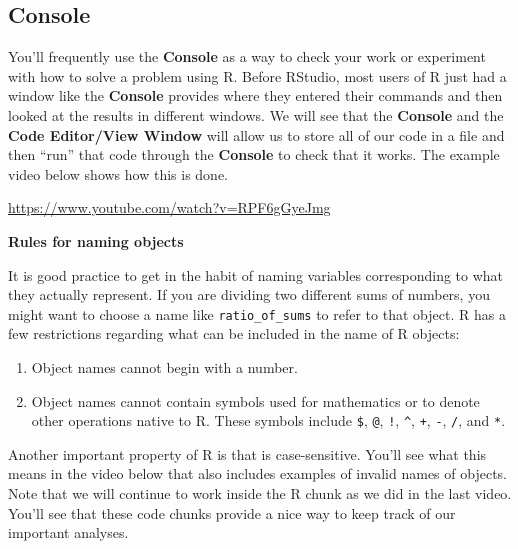 \documentclass[]{tufte-book}
\providecommand{\tightlist}{%
  \setlength{\itemsep}{0pt}\setlength{\parskip}{0pt}}
\begin{document}
\hypertarget{console}{%
\subsection{Console}\label{console}}

You'll frequently use the \textbf{Console} as a way to check your work or experiment with how to solve a problem using R. Before RStudio, most users of R just had a window like the \textbf{Console} provides where they entered their commands and then looked at the results in different windows. We will see that the \textbf{Console} and the \textbf{Code Editor/View Window} will allow us to store all of our code in a file and then ``run'' that code through the \textbf{Console} to check that it works. The example video below shows how this is done.

\vspace{0.1in}\begin{center}\footnotesize{\url{https://www.youtube.com/watch?v=RPF6gGyeJmg}}\end{center}\vspace{0.1in}

\vspace*{0.2in}

\noindent\textbf{Rules for naming objects}\vspace*{0.1in}

It is good practice to get in the habit of naming variables corresponding to what they actually represent. If you are dividing two different sums of numbers, you might want to choose a name like \texttt{ratio\_of\_sums} to refer to that object. R has a few restrictions regarding what can be included in the name of R objects:

\begin{enumerate}
\def\labelenumi{\arabic{enumi}.}
\tightlist
\item
  Object names cannot begin with a number.
\item
  Object names cannot contain symbols used for mathematics or to denote other operations native to R. These symbols include \texttt{\$}, \texttt{@}, \texttt{!}, \texttt{\^{}}, \texttt{+}, \texttt{-}, \texttt{/}, and \texttt{*}.
\end{enumerate}

Another important property of R is that is case-sensitive. You'll see what this means in the video below that also includes examples of invalid names of objects. Note that we will continue to work inside the R chunk as we did in the last video. You'll see that these code chunks provide a nice way to keep track of our important analyses.
\end{document}
